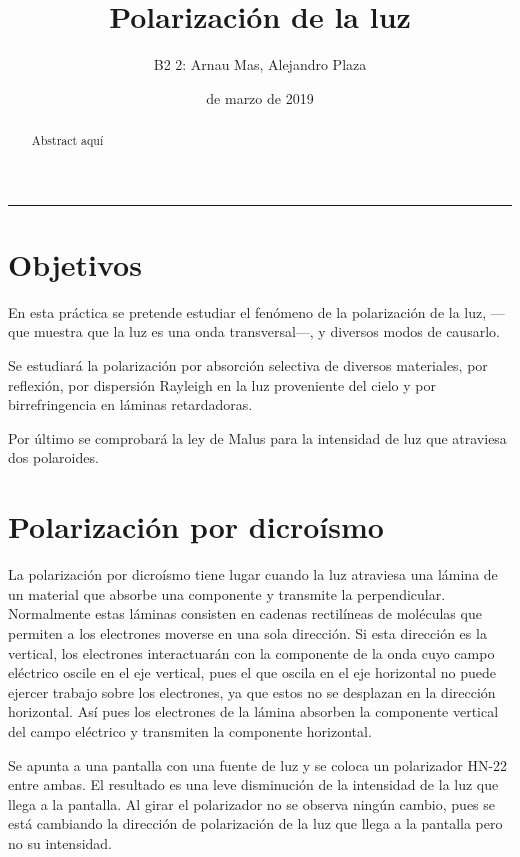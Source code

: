 \documentclass[12pt]{article}
\title{\sffamily {\bfseries Práctica 5:} Polarización de la luz}
\author{\sffamily B2 2: Arnau Mas, Alejandro Plaza}
\date{\sffamily 28 de marzo de 2019}
\numberwithin{table}{section}
\numberwithin{figure}{section}
\numberwithin{equation}{section}
\begin{document}
\maketitle
\renewcommand{\abstractname}{\sffamily \bfseries Resumen:}
\begin{abstract}
Abstract aquí
\end{abstract}
\hrule

\section{Objetivos}
En esta práctica se pretende estudiar el fenómeno de la polarización de la luz, ---que muestra que la luz es una onda transversal---, y diversos modos de causarlo.

Se estudiará la polarización por absorción selectiva de diversos materiales, por reflexión, por dispersión Rayleigh en la luz proveniente del cielo y por birrefringencia en láminas retardadoras.

Por último se comprobará la ley de Malus para la intensidad de luz que atraviesa dos polaroides.

\section{Polarización por dicroísmo}
La polarización por dicroísmo tiene lugar cuando la luz atraviesa una lámina de un material que absorbe una componente y transmite la perpendicular. Normalmente estas láminas consisten en cadenas rectilíneas de moléculas que permiten a los electrones moverse en una sola dirección. Si esta dirección es la vertical, los electrones interactuarán con la componente de la onda cuyo campo eléctrico oscile en el eje vertical, pues el que oscila en el eje horizontal no puede ejercer trabajo sobre los electrones, ya que estos no se desplazan en la dirección horizontal. Así pues los electrones de la lámina absorben la componente vertical del campo eléctrico y transmiten la componente horizontal.

Se apunta a una pantalla con una fuente de luz y se coloca un polarizador HN-22 entre ambas. El resultado es una leve disminución de la intensidad de la luz que llega a la pantalla. Al girar el polarizador no se observa ningún cambio, pues se está cambiando la dirección de polarización de la luz que llega a la pantalla pero no su intensidad.
\end{document}
